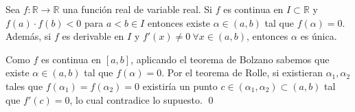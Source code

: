        \begin{prop}
        Sea $f: \mathbb{R} \longrightarrow \mathbb{R}$ una función real de variable real. Si $f$ es continua en $I \subset \mathbb{R}$ y $f(a) \cdot f(b) < 0$ para $a < b \in I$ entonces existe $\alpha \in (a,b)$ tal que $f(\alpha)=0$. Además, si $f$ es derivable en $I$ y $f'(x) \neq 0 \: \forall x \in (a,b)$, entonces $\alpha$ es única.           
           \end{prop}
\begin{dem}
Como $f$ es continua en $[a,b]$, aplicando el teorema de Bolzano sabemos que existe $\alpha\in(a,b)$ tal que $f(\alpha)=0$. Por el teorema de Rolle, si existieran $\alpha_1,\alpha_2$ tales que $f(\alpha_1)=f(\alpha_2)=0$ existiría un punto $c\in (\alpha_1,\alpha_2)\subset(a,b)$ tal que $f'(c)=0$, lo cual contradice lo supuesto.
\qed\end{dem}
